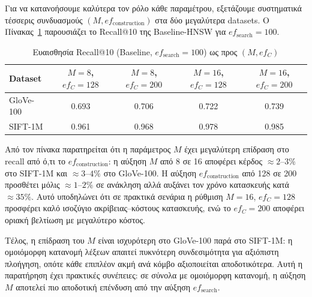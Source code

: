 \documentclass[12pt,a4paper]{article}
\begin{document}
Για να κατανοήσουμε καλύτερα τον ρόλο κάθε παραμέτρου, εξετάζουμε συστηματικά τέσσερις συνδυασμούς $(M, ef_{\text{construction}})$ στα δύο μεγαλύτερα datasets. Ο Πίνακας~\ref{tab:param_sensitivity} παρουσιάζει το Recall@10 της Baseline-HNSW για $ef_{\text{search}} = 100$.

\begin{table}[H]
\centering
\caption{Ευαισθησία Recall@10 (Baseline, $ef_{\text{search}}=100$) ως προς $(M, ef_C)$}
\label{tab:param_sensitivity}
\begin{tabular}{lcccc}
\toprule
\textbf{Dataset} & $M=8$, $ef_C=128$ & $M=8$, $ef_C=200$ & $M=16$, $ef_C=128$ & $M=16$, $ef_C=200$ \\
\midrule
GloVe-100  & 0.693 & 0.706 & 0.722 & 0.739 \\
SIFT-1M    & 0.961 & 0.968 & 0.978 & 0.985 \\
\bottomrule
\end{tabular}
\end{table}

Από τον πίνακα παρατηρείται ότι η παράμετρος $M$ έχει μεγαλύτερη επίδραση στο recall από ό,τι το $ef_{\text{construction}}$: η αύξηση $M$ από 8 σε 16 αποφέρει κέρδος $\approx 2\text{--}3\%$ στο SIFT-1M και $\approx 3\text{--}4\%$ στο GloVe-100. Η αύξηση $ef_{\text{construction}}$ από 128 σε 200 προσθέτει μόλις $\approx 1\text{--}2\%$ σε ανάκληση αλλά αυξάνει τον χρόνο κατασκευής κατά $\approx 35\%$. Αυτό υποδηλώνει ότι σε πρακτικά σενάρια η ρύθμιση $M=16$, $ef_C=128$ προσφέρει καλό ισοζύγιο ακρίβειας--κόστους κατασκευής, ενώ το $ef_C=200$ αποφέρει οριακή βελτίωση με μεγαλύτερο κόστος.

Τέλος, η επίδραση του $M$ είναι ισχυρότερη στο GloVe-100 παρά στο SIFT-1M: η ομοιόμορφη κατανομή λέξεων απαιτεί πυκνότερη συνδεσιμότητα για αξιόπιστη πλοήγηση, οπότε κάθε επιπλέον ακμή ανά κόμβο αξιοποιείται αποδοτικότερα. Αυτή η παρατήρηση έχει πρακτικές συνέπειες: σε σύνολα με ομοιόμορφη κατανομή, η αύξηση $M$ αποτελεί πιο αποδοτική επένδυση από την αύξηση $ef_{\text{search}}$.

\newpage
\end{document}
